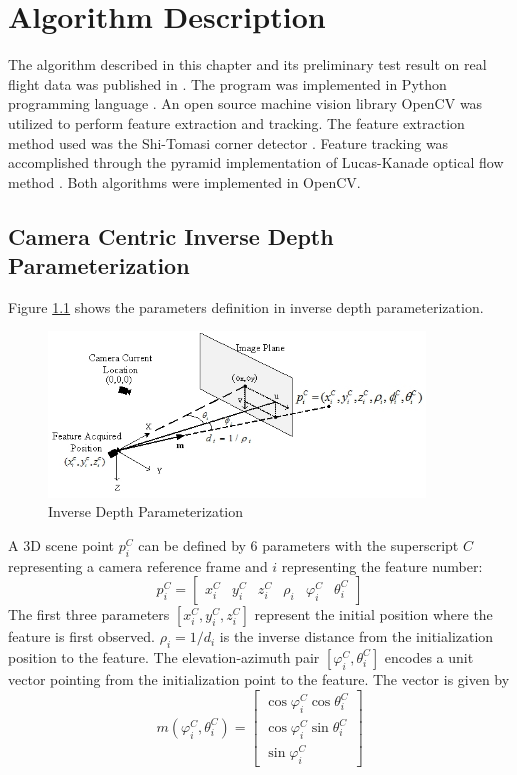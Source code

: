 \chapter{Algorithm Description}\label{ch:algorithm}

The algorithm described in this chapter and its preliminary test
result on real flight data was published in
\cite{zhang_obstacle_2012}. The program was implemented in Python
programming language \cite{_python_????}. An open source machine
vision library OpenCV was utilized to perform feature extraction and
tracking. The feature extraction method used was the Shi-Tomasi corner
detector \cite{shi_good_1994}. Feature tracking was accomplished
through the pyramid implementation of Lucas-Kanade optical flow method
\cite{bouguet_pyramidal_1999}. Both algorithms were implemented in
OpenCV. 

\section{Camera Centric Inverse Depth Parameterization}
Figure \ref{fig:algo1} shows the parameters definition in inverse
depth parameterization.

\begin{figure}[h]
\centering
\includegraphics[width=10cm, keepaspectratio=true]{./Figures/idp.jpg}
\caption{Inverse Depth Parameterization}
\label{fig:algo1}
\end{figure}

A 3D scene point $p_{i}^{C}$ can be defined by 6 parameters with the 
superscript $C$ representing a camera reference frame and $i$
representing the feature number:
\begin{equation}
p_{i}^{C}=\begin{bmatrix}
x_{i}^{C} & y_{i}^{C} & z_{i}^{C} & \rho _{i} & \varphi _{i}^{C} & 
\theta _{i}^{C} 
\end{bmatrix}
\end{equation}
The first three parameters $[x_{i}^{C}, y_{i}^{C}, z_{i}^{C}]$
represent the initial position where the feature is first observed.
$\rho_{i} = 1/d_i$ is the inverse distance from the initialization position
to the feature. The elevation-azimuth pair $[\varphi_{i}^{C},
\theta_{i}^{C}]$ encodes a unit vector pointing from the
initialization point to the feature. The vector is given by
\begin{equation}
\label{eq:m}
m(\varphi_{i}^{C}, \theta_{i}^{C})=\begin{bmatrix}
\cos\varphi_{i}^{C}\cos\theta _{i}^{C} \\
\cos\varphi_{i}^{C}\sin\theta _{i}^{C} \\
\sin\varphi_{i}^{C}
\end{bmatrix}
\end{equation}

